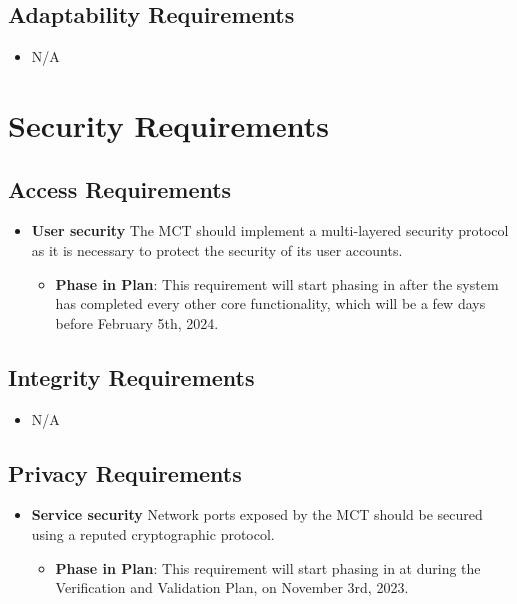 \documentclass[12pt]{article}
\begin{document}
\subsection{Adaptability Requirements}
\begin{itemize}
    \item N/A
\end{itemize}

\section{Security Requirements}
\subsection{Access Requirements}

\begin{itemize}
    \item \textbf{User security} The MCT should implement a multi-layered security protocol as it is necessary to protect the security of its user accounts.
    \begin{itemize}
        \item \textbf{Phase in Plan}: This requirement will start phasing in after the system has completed every other core functionality, which will be a few days before February 5th, 2024.
    \end{itemize}
\end{itemize}


\subsection{Integrity Requirements}
\begin{itemize}
    \item N/A
\end{itemize}
\subsection{Privacy Requirements}

\begin{itemize}
    \item \textbf{Service security} Network ports exposed by the MCT should be secured using a reputed cryptographic protocol.
    \begin{itemize}
        \item \textbf{Phase in Plan}: This requirement will start phasing in at during the Verification and Validation Plan, on November 3rd, 2023. 
    \end{itemize}
\end{itemize}
\end{document}
